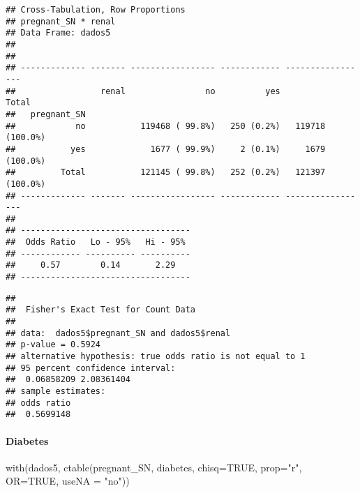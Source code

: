\documentclass[
]{article}
\newenvironment{Shaded}{\begin{snugshade}}{\end{snugshade}}
\newcommand{\AttributeTok}[1]{\textcolor[rgb]{0.77,0.63,0.00}{#1}}
\newcommand{\CommentTok}[1]{\textcolor[rgb]{0.56,0.35,0.01}{\textit{#1}}}
\newcommand{\ConstantTok}[1]{\textcolor[rgb]{0.00,0.00,0.00}{#1}}
\newcommand{\FunctionTok}[1]{\textcolor[rgb]{0.00,0.00,0.00}{#1}}
\newcommand{\NormalTok}[1]{#1}
\newcommand{\SpecialCharTok}[1]{\textcolor[rgb]{0.00,0.00,0.00}{#1}}
\newcommand{\StringTok}[1]{\textcolor[rgb]{0.31,0.60,0.02}{#1}}
\begin{document}
\begin{verbatim}
## Cross-Tabulation, Row Proportions  
## pregnant_SN * renal  
## Data Frame: dados5  
## 
## 
## ------------- ------- ----------------- ------------ -----------------
##                 renal                no          yes             Total
##   pregnant_SN                                                         
##            no           119468 ( 99.8%)   250 (0.2%)   119718 (100.0%)
##           yes             1677 ( 99.9%)     2 (0.1%)     1679 (100.0%)
##         Total           121145 ( 99.8%)   252 (0.2%)   121397 (100.0%)
## ------------- ------- ----------------- ------------ -----------------
## 
## ----------------------------------
##  Odds Ratio   Lo - 95%   Hi - 95% 
## ------------ ---------- ----------
##     0.57        0.14       2.29   
## ----------------------------------
\end{verbatim}

\begin{Shaded}
\end{Shaded}

\begin{verbatim}
## 
##  Fisher's Exact Test for Count Data
## 
## data:  dados5$pregnant_SN and dados5$renal
## p-value = 0.5924
## alternative hypothesis: true odds ratio is not equal to 1
## 95 percent confidence interval:
##  0.06858209 2.08361404
## sample estimates:
## odds ratio 
##  0.5699148
\end{verbatim}

\hypertarget{diabetes}{%
\paragraph{\texorpdfstring{{ Diabetes }}{ Diabetes }}\label{diabetes}}

\begin{Shaded}
\begin{Highlighting}[]
\FunctionTok{with}\NormalTok{(dados5, }\FunctionTok{ctable}\NormalTok{(pregnant\_SN, diabetes, }\AttributeTok{chisq=}\ConstantTok{TRUE}\NormalTok{, }\AttributeTok{prop=}\StringTok{"r"}\NormalTok{, }\AttributeTok{OR=}\ConstantTok{TRUE}\NormalTok{, }\AttributeTok{useNA =} \StringTok{"no"}\NormalTok{))}
\end{Highlighting}
\end{Shaded}
\end{document}
